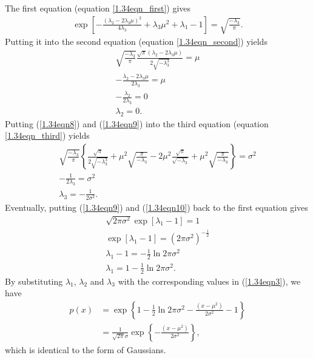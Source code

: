 \begin{answer}{}
	The first equation (equation \ref{1.34eqn_first}) gives
	\begin{align}\label{1.34eqn8}
		\exp\left[ -\frac{(\lambda_2 - 2\lambda_3\mu)^2}{4\lambda_3} + \lambda_3 \mu^2 + \lambda_1 - 1 \right] = \sqrt{\frac{-\lambda_3}{\pi}}.
	\end{align}
	Putting it into the second equation (equation \ref{1.34eqn_second}) yields
	\begin{gather}
		  \sqrt{\frac{-\lambda_3}{\pi}}\frac{\sqrt{\pi}(\lambda_2 - 2\lambda_3\mu)}{2\sqrt{-\lambda_3^3}} = \mu\\
		  -\frac{\lambda_2 - 2\lambda_3\mu}{2\lambda_3} = \mu\\
		  -\frac{\lambda_2}{2\lambda_3} = 0\\
		  \lambda_2 = 0. \label{1.34eqn9}
	\end{gather}
	Putting (\ref{1.34eqn8}) and (\ref{1.34eqn9}) into the third equation (equation \ref{1.34eqn_third}) yields
	\begin{gather}
		\sqrt{\frac{-\lambda_3}{\pi}}\left\{ \frac{\sqrt{\pi}}{2\sqrt{-\lambda_3^3}} + \mu^2\sqrt{\frac{\pi}{-\lambda_3}}  -2\mu^2 \frac{\sqrt{\pi}}{\sqrt{-\lambda_3}} + \mu^2\sqrt{\frac{\pi}{-\lambda_3}} \right\} = \sigma^2\\
		-\frac{1}{2\lambda_3} = \sigma^2\\
		\lambda_3 = -\frac{1}{2\sigma^2}. \label{1.34eqn10}
	\end{gather}
	Eventually, putting (\ref{1.34eqn9}) and (\ref{1.34eqn10}) back to the first equation gives
	\begin{gather}
		\sqrt{2\pi\sigma^2} \exp\left[ \lambda_1 - 1 \right] = 1\\
		\exp\left[ \lambda_1 - 1 \right] = \left(2\pi\sigma^2\right)^{-\frac{1}{2}}\\
		\lambda_1 - 1 = -\frac{1}{2}\ln 2\pi\sigma^2\\
		\lambda_1 = 1 - \frac{1}{2}\ln 2\pi\sigma^2. \label{1.34eqn11}
	\end{gather}
	By substituting $\lambda_1$, $\lambda_2$ and $\lambda_3$ with the corresponding values in (\ref{1.34eqn3}), we have
	\begin{align}
		p(x) &= \exp\left\{ 1 - \frac{1}{2}\ln 2\pi\sigma^2 -\frac{(x - \mu^2)}{2\sigma^2} -1 \right\}\\
		&= \frac{1}{\sqrt{2\pi}\sigma} \exp\left\{ -\frac{(x - \mu^2)}{2\sigma^2} \right\},
	\end{align}
	which is identical to the form of Gaussians.
\end{answer}